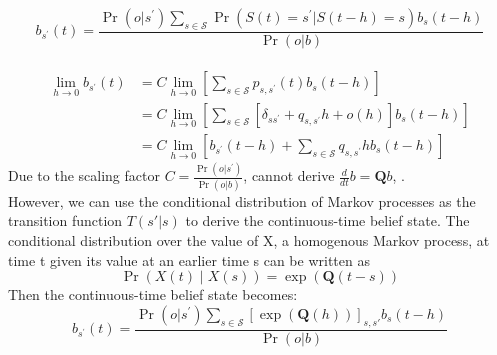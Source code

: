\begin{equation}
b_{s^{\prime}}(t) =\frac{\operatorname{Pr}\left(o |s^{\prime}\right) \sum_{s \in \mathcal{S}} \operatorname{Pr}\left(S(t)=s^{\prime} | S(t-h)=s\right) b_{s}(t-h)}{\operatorname{Pr}(o | b)}
\end{equation}\\
\begin{equation}
\begin{aligned}
\lim_{h\rightarrow 0} b_{s^{\prime}}(t) &= C \lim_{h\rightarrow 0}\left[  \sum_{s \in \mathcal{S}} p_{s, s^{\prime}}(t) b_{s}(t-h)\right]\\
&= C \lim_{h\rightarrow 0}\left[  \sum_{s \in \mathcal{S}} \left[ \delta_{ss^{\prime}}+q_{s,s^{\prime}} h+o(h)\right]  b_{s}(t-h)\right]\\
&= C \lim_{h\rightarrow 0}\left[ b_{s^{\prime}}(t-h) + \sum_{s \in \mathcal{S}} q_{s,s^{\prime}} h  b_{s}(t-h)\right]
\end{aligned}
\end{equation}
Due to the scaling factor $ C =\frac{\operatorname{Pr}\left(o |s^{\prime}\right)}{\operatorname{Pr}(o | b)} $, cannot derive $ \frac{d}{dt} b = \textbf{Q}b$, .\\
However, we can use the conditional distribution of Markov processes as the transition function $ T(s'|s) $ to derive the continuous-time belief state. The conditional distribution over the value of X, a homogenous Markov process, at time t given its value at an earlier time s can be written as 
\begin{equation}
\operatorname{Pr}\left(X(t) \mid X(s)\right) = \exp(\textbf{Q}(t-s))
\end{equation}
Then the continuous-time belief state becomes:
\begin{equation}
b_{s^{\prime}}(t) =\frac{\operatorname{Pr}\left(o |s^{\prime}\right) \sum_{s \in \mathcal{S}}\left[ \exp(\textbf{Q}(h))\right]_{s,s'}  b_{s}(t-h)}{\operatorname{Pr}(o | b)}
\end{equation}
